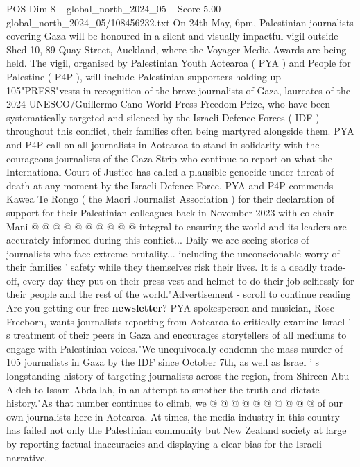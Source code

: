 \begin{textsample}{POS Dim 8 – global\_north\_2024\_05 – Score 5.00 – global\_north\_2024\_05/108456232.txt}  \label{ex:f8_pos_174}
On 24th May, 6pm, Palestinian journalists covering Gaza will be honoured in a silent and visually impactful vigil outside Shed 10, 89 Quay Street, Auckland, where the Voyager Media Awards are being held.
The vigil, organised by Palestinian Youth Aotearoa ( PYA ) and People for Palestine ( P4P ), will include Palestinian supporters holding up 105"PRESS"vests in recognition of the brave journalists of Gaza, laureates of the 2024 UNESCO/Guillermo Cano World Press Freedom Prize, who have been systematically targeted and silenced by the Israeli Defence Forces ( IDF ) throughout this conflict, their families often being martyred alongside them.
PYA and P4P call on all journalists in Aotearoa to stand in solidarity with the courageous journalists of the Gaza Strip who continue to report on what the International Court of Justice has called a plausible genocide under threat of death at any moment by the Israeli Defence Force.
PYA and P4P commends Kawea Te Rongo ( the Maori Journalist Association ) for their declaration of support for their Palestinian colleagues back in November 2023 with co-chair Mani @ @ @ @ @ @ @ @ @ @ integral to ensuring the world and its leaders are accurately informed during this conflict...
Daily we are seeing stories of journalists who face extreme brutality... including the unconscionable worry of their families ' safety while they themselves risk their lives.
It is a deadly trade-off, every day they put on their press vest and helmet to do their job selflessly for their people and the rest of the world."Advertisement - scroll to continue reading Are you getting our free \textbf{newsletter}?
PYA spokesperson and musician, Rose Freeborn, wants journalists reporting from Aotearoa to critically examine Israel ' s treatment of their peers in Gaza and encourages storytellers of all mediums to engage with Palestinian voices."We unequivocally condemn the mass murder of 105 journalists in Gaza by the IDF since October 7th, as well as Israel ' s longstanding history of targeting journalists across the region, from Shireen Abu Akleh to Issam Abdallah, in an attempt to smother the truth and dictate history."As that number continues to climb, we @ @ @ @ @ @ @ @ @ @ of our own journalists here in Aotearoa.
At times, the media industry in this country has failed not only the Palestinian community but New Zealand society at large by reporting factual inaccuracies and displaying a clear bias for the Israeli narrative.

\end{textsample}
